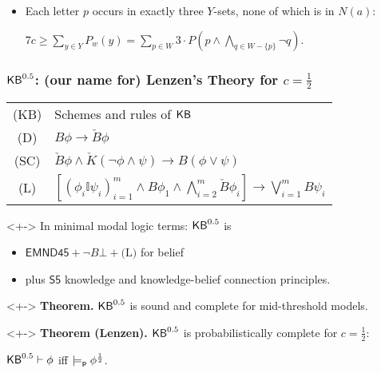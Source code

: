 \begin{frame}
\begin{uncoverenv}
\begin{itemize}
\begin{itemize}
      \item Each letter $p$ occurs in exactly three $Y$-sets, none of
        which is in $N(a)$:
        \begin{center}
          $7c\geq\sum_{y\in Y} P_w(y) = \sum_{p\in
            W}3\cdot P\left(p\land\bigwedge_{q\in W-\{p\}}\lnot
            q\right)$\enspace.
        \end{center}
      \end{itemize}
    \end{itemize}
  \end{uncoverenv}
\end{frame}

\begin{frame}
  \frametitle{${\mathsf{KB}}^{0.5}$: (our name for) Lenzen's Theory for $c=\frac
    12$} \vspace{-1em}\uncover<+->{}
  \begin{center}
    \small
    \renewcommand{\arraystretch}{1.3}
    \begin{tabular}[t]{cl}
      (KB) & Schemes and rules of ${\mathsf{KB}}$
      \\
      (D) &
      $B\phi\to \check B\phi$
      \\
      (SC) &
      $\check B\phi \land 
      \check K(\lnot\phi\land\psi) \to 
      B(\phi\lor\psi)$
      \\
      (L) &
      $\textstyle [(\phi_i\mathbb{I}\psi_i)_{i=1}^m
      \land B\phi_1 \land \bigwedge_{i=2}^m \check B\phi_i] \to
      \bigvee_{i=1}^m B\psi_i$
    \end{tabular}
    \renewcommand{\arraystretch}{1.0}
  \end{center}

  \begin{myboxp}<+->
    In minimal modal logic terms: ${\mathsf{KB}}^{0.5}$ is
    \begin{itemize}
    \item $\mathsf{EMND45}+\lnot B\bot+\text{(L)}$ for belief

    \item plus $\mathsf{S5}$ knowledge and knowledge-belief
      connection principles.
    \end{itemize}
  \end{myboxp}

  \begin{myboxy}<+->
    \textbf{Theorem.} ${\mathsf{KB}}^{0.5}$ is sound and complete for
    mid-threshold models.
  \end{myboxy}

  \begin{myboxb}<+-> \textbf{Theorem (Lenzen).} ${\mathsf{KB}}^{0.5}$ is
    probabilistically complete for $c=\frac 12$:
    \begin{center}
      ${\mathsf{KB}}^{0.5}\vdash\phi$
      \qquad{}iff\qquad
      $\models_{\mathsf{p}}\phi^{\frac 12}$\enspace.
    \end{center}
  \end{myboxb}
\end{frame}

